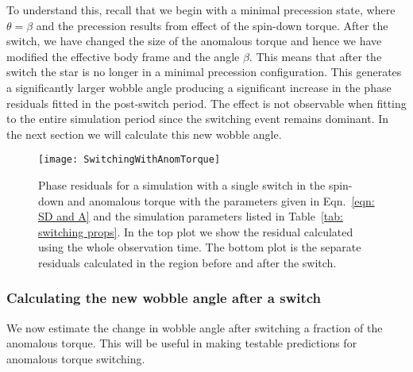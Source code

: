 \documentclass[../full_thesis/full_thesis.tex]{subfiles}
\begin{document}
To understand this, recall that we begin with a minimal precession state, where
$\theta = \beta$ and the precession results from effect of the spin-down
torque.  After the switch, we have changed the size of the anomalous torque and
hence we have modified the effective body frame and the angle $\beta$. This
means that after the switch the star is no longer in a minimal
precession configuration.
This generates a significantly larger wobble angle producing a significant
increase in the phase residuals fitted in the post-switch period. The effect is
not observable when fitting to the entire simulation period since the switching
event remains dominant. In the next section we will calculate this new wobble
angle.
\begin{figure}[htb]
\texttt{[image: SwitchingWithAnomTorque]}
\caption{Phase residuals for a simulation with a single switch in the spin-down
and anomalous torque with the parameters given in Eqn.~\eqref{eqn: SD and A}
and the simulation parameters listed in Table~\ref{tab: switching props}. In
the top plot we show the residual calculated using the whole observation time.
The bottom plot is the separate residuals calculated in the region before
and after the switch.}
\label{fig: switching with anom}
\end{figure}

\subsubsection{Calculating the new wobble angle after a switch}
We now estimate the change in wobble angle after switching a fraction of the
anomalous torque. This will be useful in making testable predictions for
anomalous torque switching.
\end{document}
